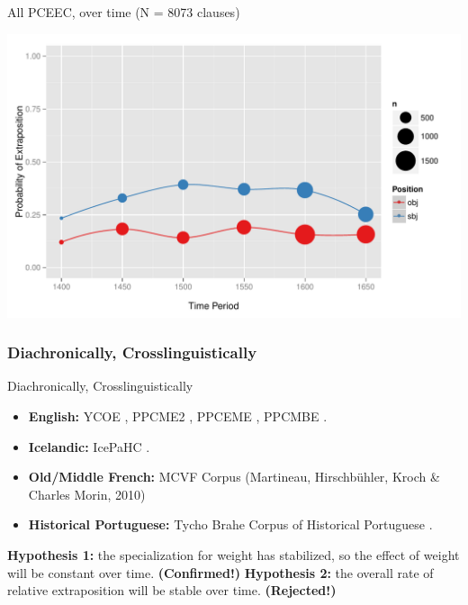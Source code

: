 \documentclass[hyperref={pdfpagelabels=false}]{beamer}
\begin{document}


\begin{frame}{All PCEEC, over time (N = 8073 clauses)}

\begin{center}
\includegraphics[width=1.1\textwidth]{exSbjObjYearBinned50.pdf}
\end{center}
\end{frame}


\subsubsection{Diachronically, Crosslinguistically}

\begin{frame}{Diachronically, Crosslinguistically}
\begin{itemize}
	\item \textbf{English:} YCOE \citep{ycoe}, PPCME2 \citep{ppcme2}, PPCEME \citep{ppceme}, PPCMBE \citep{ppcmbe}.
	\item \textbf{Icelandic:} IcePaHC \citep{icepahc09}.
	\item \textbf{Old/Middle French:} MCVF Corpus (Martineau, Hirschbühler, Kroch \& Charles Morin, 2010) \nocite{mcvf}
	\item \textbf{Historical Portuguese:} Tycho Brahe Corpus of Historical Portuguese \citep{tychobrahe}.
	\end{itemize}
	\textbf{Hypothesis 1:} the specialization for weight has stabilized, so the effect of weight will be constant over time. \textbf{(Confirmed!)}
	\textbf{Hypothesis 2:} the overall rate of relative extraposition will be stable over time. \textbf{(Rejected!)}

\end{frame}
\end{document}
